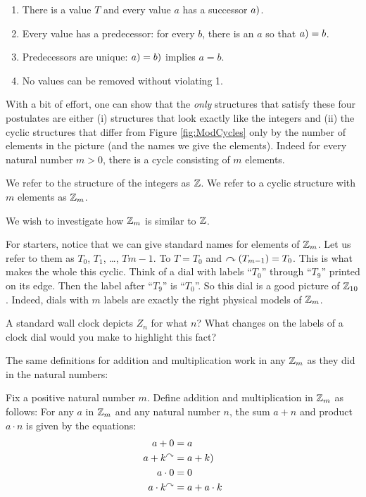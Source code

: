 \begin{enumerate}
	\item There is a value $T$ and every value $a$ has a successor $\next(a)$.
	\item Every value has a predecessor: for every $b$, there is an $a$ so that $\next(a) = b$.
	\item Predecessors are unique: $\next(a) = \next(b)$ implies $a=b$.
	\item No values can be removed without violating 1.
\end{enumerate}

With a bit of effort, one can show that the \emph{only} structures that satisfy these four postulates are either (i) structures that look exactly like the integers and (ii) the cyclic structures that differ from Figure \ref{fig:ModCycles} only by the number of elements in the picture (and the names we give the elements). Indeed for every natural number $m>0$, there is a cycle consisting of $m$ elements.

\begin{defn}
	We refer to the structure of the integers as ${\mathbb Z}$. We refer to a cyclic structure with $m$ elements as ${\mathbb Z}_m$. 
\end{defn}

We wish to investigate how ${\mathbb Z}_m$ is similar to ${\mathbb Z}$. 

For starters, notice that we can give standard names for elements of ${\mathbb Z}_m$. Let us refer to them as $T_0$, $T_1$, \ldots, $T{m-1}$. To $T=T_0$ and $\curvearrowright(T_{m-1}) = T_0$. This is what makes the whole this cyclic.
Think of a dial with labels ``$T_0$'' through ``$T_9$'' printed on its edge. Then the label after ``$T_9$'' is ``$T_0$''. So this dial is a good picture of ${\mathbb Z}_{10}$. Indeed, dials with $m$ labels are exactly the right physical models of ${\mathbb Z}_m$. 

\begin{exer}
	\begin{exercise}
		\item A standard wall clock depicts $Z_n$ for what $n$? What changes on the labels of a clock dial would you make to highlight this fact?
	\end{exercise}
\end{exer}   


The same definitions for addition and multiplication work in any ${\mathbb Z}_m$ as they did in the natural numbers:

\begin{defn}
	Fix a positive natural number $m$. Define addition and multiplication in ${\mathbb Z}_m$ as follows: For any $a$ in ${\mathbb Z}_m$ and any natural number $n$, the sum $a+n$ and product $a\cdot n$ is given by the equations:
	\begin{align*}
		a + 0 &= a\\
		a + k^\nxt &= \next(a+k)\\
		a\cdot 0 &= 0\\
		a\cdot k^\nxt &= a + a\cdot k
	\end{align*}
\end{defn}

